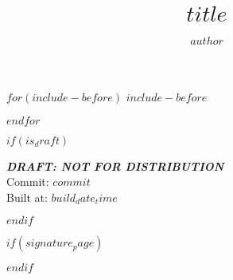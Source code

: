 \documentclass[11 pt]{report}
\begin{document}
$for(include-before)$
$include-before$

$endfor$

%

$if(is_draft)$
\thispagestyle{empty}%
    \null
    \vfill
    \begin{center}
        \rm\expandafter{\LARGE{\textbf{\emph{DRAFT: NOT FOR DISTRIBUTION}}}}\\
        [16 pt] 
        Commit: $commit$ \\
        \vspace{1em}
        Built at: $build_date_time$
    \end{center}
    \vfill
\newpage
$endif$

%


$if(signature_page)$
    
$endif$

\title{$title$}

\author{$author$}


\end{document}
